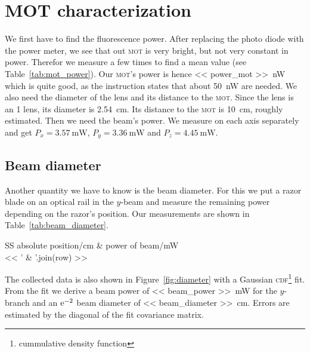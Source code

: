 \documentclass[11pt, english, fleqn, DIV=15, headinclude, BCOR=2cm]{scrreprt}
\newcommand\mot{\textsc{mot}}
\begin{document}
\section{MOT characterization}

We first have to find the fluorescence power. After replacing the photo diode
with the power meter, we see that out \mot{} is very bright, but not very
constant in power.  Therefor we measure a few times to find a mean value (see
Table~\ref{tab:mot_power}). Our \mot's power is hence \SI{<< power_mot
>>}{\nano\watt} which is quite good, as the instruction states that about
\SI{50}{\nano\watt} are needed. We also need the diameter of the lens and its
distance to the \mot. Since the lens is an \SI{1}{\inch} lens, its diameter is
\SI{2.54}{\centi\meter}. Its distance to the \mot{} is \SI{10}{\centi\meter},
roughly estimated. Then we need the beam's power. We measure on each axis
separately and get $P_x = \SI{3.57}{\milli\watt}$, $P_y =
\SI{3.36}{\milli\watt}$ and $P_z = \SI{4.45}{\milli\watt}$.

\subsection{Beam diameter}

Another quantity we have to know is the beam diameter. For this we put a razor
blade on an optical rail in the $y$-beam and measure the remaining power
depending on the razor's position. Our measurements are shown in
Table~\ref{tab:beam_diameter}.

\begin{table}
    \centering
    \begin{tabular}{SS}
        \toprule
        {absolute position/\si{\centi\meter}}
        & {power of beam/\si{\milli\watt}} \\
        \midrule
        << ' & '.join(row) >> \\
        \bottomrule
    \end{tabular}
    \caption{%
        Measurement to estimate the beam diameter.
    }
    \label{tab:beam_diameter}
\end{table}

The collected data is also shown in Figure~\ref{fig:diameter} with a Gaussian
\textsc{cdf}\footnote{cummulative density function} fit. From the fit we derive
a beam power of \SI{<< beam_power >>}{\milli\watt} for the $y$-branch and an
$\mathrm e^{-2}$ beam diameter of \SI{<< beam_diameter >>}{\centi\meter}. Errors are
estimated by the diagonal of the fit covariance matrix.
\end{document}
